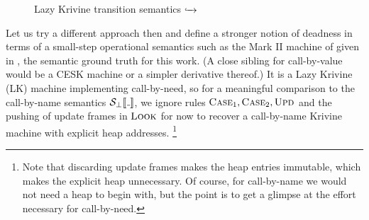 \begin{figure}
\caption{Lazy Krivine transition semantics $\xhookrightarrow{\hspace{1.5ex}}$}
  \label{fig:lk-semantics}
\end{figure}

Let us try a different approach then and define a stronger notion of deadness
in terms of a small-step operational semantics such as the Mark II machine of
\citet{Sestoft:97} given in , the semantic ground truth
for this work. (A close sibling for call-by-value would be a CESK machine
\citep{Felleisen:87} or a simpler derivative thereof.)
It is a Lazy Krivine (LK) machine implementing call-by-need, so for a meaningful
comparison to the call-by-name semantics $\semscott{\wild}$, we ignore rules
$\textsc{Case}_1, \textsc{Case}_2, \textsc{Upd}$ and the pushing of update frames in $\textsc{Look}$ for
now to recover a call-by-name Krivine machine with explicit heap addresses.%
\footnote{Note that discarding update frames makes the heap entries immutable,
which makes the explicit heap unnecessary. Of course, for call-by-name we would
not need a heap to begin with, but the point is to get a glimpse at the effort
necessary for call-by-need.}

